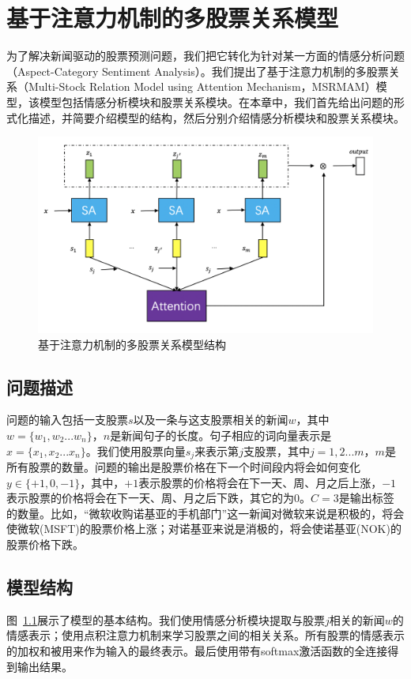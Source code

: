 \chapter{基于注意力机制的多股票关系模型}
\label{cha: msra}
为了解决新闻驱动的股票预测问题，我们把它转化为针对某一方面的情感分析问题（Aspect-Category Sentiment Analysis）。我们提出了基于注意力机制的多股票关系（Multi-Stock Relation Model using Attention Mechanism，MSRMAM）模型，该模型包括情感分析模块和股票关系模块。在本章中，我们首先给出问题的形式化描述，并简要介绍模型的结构，然后分别介绍情感分析模块和股票关系模块。
\begin{figure}[H] %
    \centering
    \includegraphics[width =0.8\linewidth]{figures/stock-relation.png}
    \caption{基于注意力机制的多股票关系模型结构}
    \label{fig: modelstructure}
\end{figure}

\section{问题描述}

问题的输入包括一支股票$s$以及一条与这支股票相关的新闻$w$，其中$w=\{w_1, w_2...w_n\}$，$n$是新闻句子的长度。句子相应的词向量表示是$x =\{x_1, x_2...x_n\}$。我们使用股票向量$s_j$来表示第$j$支股票，其中$j = 1, 2...m$，$m$是所有股票的数量。问题的输出是股票价格在下一个时间段内将会如何变化$y\in \{+1, 0, -1\}$，其中，$+ 1$表示股票的价格将会在下一天、周、月之后上涨，$- 1$表示股票的价格将会在下一天、周、月之后下跌，其它的为$0$。$C = 3$是输出标签的数量。比如，“微软收购诺基亚的手机部门”这一新闻对微软来说是积极的，将会使微软(MSFT)的股票价格上涨；对诺基亚来说是消极的，将会使诺基亚(NOK)的股票价格下跌。
\section{模型结构}
图~\ref{fig: modelstructure}展示了模型的基本结构。我们使用情感分析模块提取与股票$j$相关的新闻$w$的情感表示；使用点积注意力机制来学习股票之间的相关关系。所有股票的情感表示的加权和被用来作为输入的最终表示。最后使用带有softmax激活函数的全连接得到输出结果。
